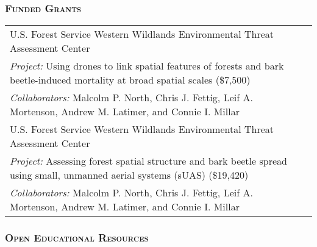 \documentclass[10pt,english]{article}
\providecommand{\tabularnewline}{\\}
\begin{document}
\subsubsection*{\textsc{Funded Grants}}
\vspace{-0.5ex}

\renewcommand{\arraystretch}{1.2}
\begin{tabularx}{\textwidth}{@{}>{\raggedright}p{5.25in} >{\raggedleft}X@{}}
U.S. Forest Service Western Wildlands Environmental Threat Assessment Center & 2018 \tabularnewline
\addtolength{\leftskip}{5ex}\emph{Project:} Using drones to link spatial features of forests and bark beetle-induced mortality at broad spatial scales (\$7,500) & \tabularnewline
\addtolength{\leftskip}{5ex}\emph{Collaborators:} Malcolm P. North, Chris J. Fettig, Leif A. Mortenson, Andrew M. Latimer, and Connie I. Millar & \tabularnewline
U.S. Forest Service Western Wildlands Environmental Threat Assessment Center & 2017 \tabularnewline
\addtolength{\leftskip}{5ex}\emph{Project:} Assessing forest spatial structure and bark beetle spread using small, unmanned aerial systems (sUAS) (\$19,420) & \tabularnewline
\addtolength{\leftskip}{5ex}\emph{Collaborators:} Malcolm P. North, Chris J. Fettig, Leif A. Mortenson, Andrew M. Latimer, and Connie I. Millar & \tabularnewline
\end{tabularx}

\vspace{1ex}

\subsubsection*{\textsc{Open Educational Resources}}
\vspace{-0.5ex}
\end{document}

